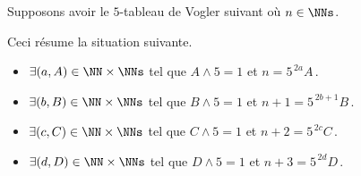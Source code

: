 

\begin{example}
	Supposons avoir le $5$-tableau de Vogler suivant où $n \in \NNs$.

	\begin{center}
	\end{center}
	
	Ceci résume la situation suivante. 
	
	\begin{itemize}
		\item $\exists (a, A) \in \NN \times \NNs$
		      tel que $A \wedge 5 = 1$ et $n     = 5^{\,2a} A$\,.
		
		\item $\exists (b, B) \in \NN \times \NNs$
		      tel que $B \wedge 5 = 1$ et $n + 1 = 5^{\,2b + 1} B$\,.
		
		\item $\exists (c, C) \in \NN \times \NNs$
		      tel que $C \wedge 5 = 1$ et $n + 2 = 5^{\,2c} C$\,.
		
		\item $\exists (d, D) \in \NN \times \NNs$
		      tel que $D \wedge 5 = 1$ et $n + 3 = 5^{\,2d} D$\,.
	\end{itemize}
\end{example}




